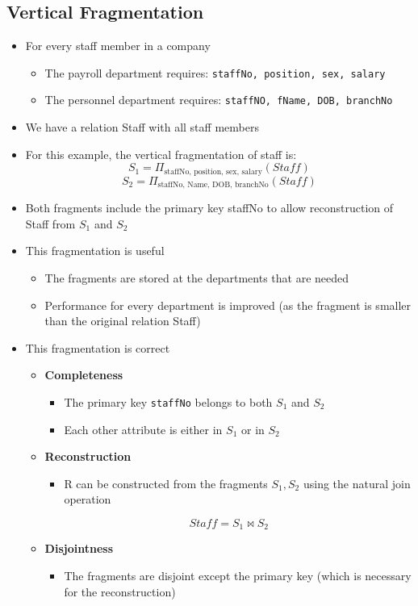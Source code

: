 \documentclass{article}[18pt]
\begin{document}
\subsection{Vertical Fragmentation}
\begin{itemize}
	\item For every staff member in a company
	\begin{itemize}
		\item The payroll department requires: \texttt{staffNo, position, sex, salary}
		\item The personnel department requires: \texttt{staffNO, fName, DOB, branchNo}
	\end{itemize}
	\item We have a relation Staff with all staff members
	\item For this example, the vertical fragmentation of staff is:
	$$S_1=\Pi_{\text{staffNo, position, sex, salary}}(Staff)$$
	$$S_2=\Pi_{\text{staffNo, Name, DOB, branchNo}}(Staff)$$
	\item Both fragments include the primary key staffNo to allow reconstruction of Staff from $S_1$ and $S_2$
	\item This fragmentation is useful
	\begin{itemize}
		\item The fragments are stored at the departments that are needed
		\item Performance for every department is improved (as the fragment is smaller than the original relation Staff)
	\end{itemize}
	\item This fragmentation is correct
	\begin{itemize}
		\item \textbf{Completeness}
		\begin{itemize}
			\item The primary key \texttt{staffNo} belongs to both $S_1$ and $S_2$
			\item Each other attribute is either in $S_1$ or in $S_2$
		\end{itemize}
		\item \textbf{Reconstruction}
		\begin{itemize}
			\item R can be constructed from the fragments $S_1,S_2$ using the natural join operation
		\end{itemize}
		$$Staff=S_1\bowtie S_2$$
		\item \textbf{Disjointness}
		\begin{itemize}
			\item The fragments are disjoint except the primary key (which is necessary for the reconstruction)
		\end{itemize}
	\end{itemize}
\end{itemize}
\end{document}
